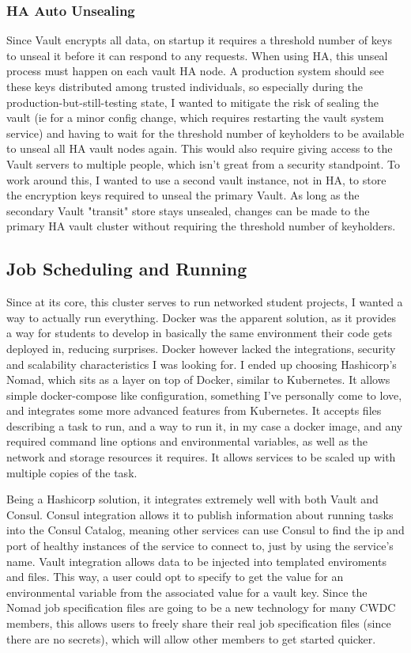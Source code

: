 \documentclass{article}
\begin{document}
\subsubsection{HA Auto Unsealing}
Since Vault encrypts all data, on startup it requires a threshold number of keys to unseal it before it can respond to any requests. When using HA, this unseal process must happen on each vault HA node. A production system should see these keys distributed among trusted individuals, so especially during the production-but-still-testing state, I wanted to mitigate the risk of sealing the vault (ie for a minor config change, which requires restarting the vault system service) and having to wait for the threshold number of keyholders to be available to unseal all HA vault nodes again. This would also require giving access to the Vault servers to multiple people, which isn't great from a security standpoint. To work around this, I wanted to use a second vault instance, not in HA, to store the encryption keys required to unseal the primary Vault. As long as the secondary Vault "transit" store stays unsealed, changes can be made to the primary HA vault cluster without requiring the threshold number of keyholders.
\subsection{Job Scheduling and Running}
Since at its core, this cluster serves to run networked student projects, I wanted a way to actually run everything. Docker was the apparent solution, as it provides a way for students to develop in basically the same environment their code gets deployed in, reducing surprises. Docker however lacked the integrations, security and scalability characteristics I was looking for. I ended up choosing Hashicorp's Nomad, which sits as a layer on top of Docker, similar to Kubernetes. It allows simple docker-compose like configuration, something I've personally come to love, and integrates some more advanced features from Kubernetes. It accepts files describing a task to run, and a way to run it, in my case a docker image, and any required command line options and environmental variables, as well as the network and storage resources it requires. It allows services to be scaled up with multiple copies of the task.

Being a Hashicorp solution, it integrates extremely well with both Vault and Consul. Consul integration allows it to publish information about running tasks into the Consul Catalog, meaning other services can use Consul to find the ip and port of healthy instances of the service to connect to, just by using the service's name. Vault integration allows data to be injected into templated enviroments and files. This way, a user could opt to specify to get the value for an environmental variable from the associated value for a vault key. Since the Nomad job specification files are going to be a new technology for many CWDC members, this allows users to freely share their real job specification files (since there are no secrets), which will allow other members to get started quicker.
\end{document}
